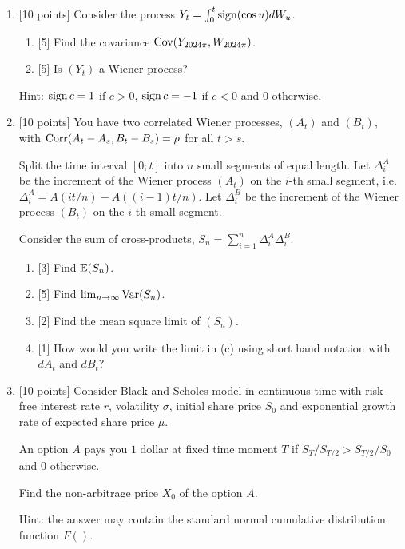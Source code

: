 \documentclass[12pt, a4paper]{article}
\begin{document}
\begin{enumerate}
\item {[10 points]}  Consider the process $Y_t = \int_0^t \operatorname{sign} (\cos u) dW_u$.


\begin{enumerate}
    \item {[5]} Find the covariance $\operatorname{Cov}(Y_{2024\pi}, W_{2024\pi})$.    
    \item {[5]} Is $(Y_t)$ a Wiener process?
\end{enumerate}


Hint: $\operatorname{sign} c = 1$ if $c>0$, $\operatorname{sign} c = -1$ if $c < 0$ and $0$ otherwise. 

    
\item {[10 points]} You have two correlated Wiener processes, $(A_t)$ and $(B_t)$, with $\operatorname{Corr}(A_t - A_s, B_t - B_s) = \rho$ for all $t > s$.

Split the time interval $[0;t]$ into $n$ small segments of equal length. 
Let $\Delta^A_i$ be the increment of the Wiener process $(A_t)$ on the $i$-th small segment, i.e. $\Delta^A_i = A(it/n) - A((i-1)t/n)$.
Let $\Delta^B_i$ be the increment of the Wiener process $(B_t)$ on the $i$-th small segment.

Consider the sum of cross-products, $S_n = \sum_{i=1}^n \Delta^A_i \Delta^B_i$.
\begin{enumerate}
    \item {[3]} Find $\operatorname{\mathbb{E}}(S_n)$.
    \item {[5]} Find $\lim_{n\rightarrow\infty} \operatorname{Var}(S_n)$.
    \item {[2]} Find the mean square limit of $(S_n)$. 
    \item {[1]} How would you write the limit in (c) using short hand notation with $dA_t$ and $dB_t$?
\end{enumerate}



\item {[10 points]} Consider Black and Scholes model in continuous time with risk-free interest rate $r$, 
volatility $\sigma$, initial share price $S_0$ and exponential growth rate of expected share price $\mu$. 

An option $A$ pays you $1$ dollar at fixed time moment $T$ if $S_T / S_{T/2} > S_{T/2} / S_0$ and $0$ otherwise. 

Find the non-arbitrage price $X_0$ of the option $A$. 

Hint: the answer may contain the standard normal cumulative distribution function $F()$.

\end{enumerate}
  
\end{document}
